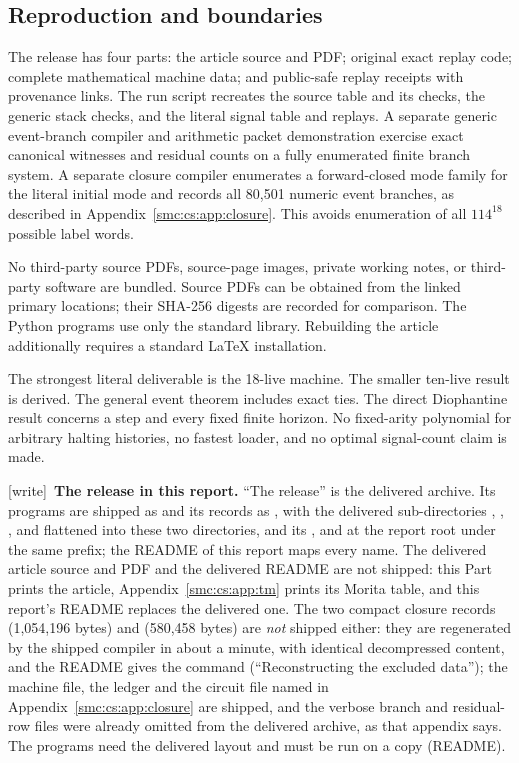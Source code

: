 \documentclass[11pt,letterpaper]{article}
\numberwithin{equation}{section}
\theoremstyle{definition}
\theoremstyle{remark}
\newcommand{\wtag}{\textup{[write]}}
\begin{document}
\subsection{Reproduction and boundaries}
The release has four parts: the article source and PDF; original exact replay code; complete mathematical machine data; and public-safe replay receipts with provenance links. The run script recreates the source table and its checks, the generic stack checks, and the literal signal table and replays. A separate generic event-branch compiler and arithmetic packet demonstration exercise exact canonical witnesses and residual counts on a fully enumerated finite branch system. A separate closure compiler enumerates a forward-closed mode family for the literal initial mode and records all 80,501 numeric event branches, as described in Appendix~\ref{smc:cs:app:closure}. This avoids enumeration of all $114^{18}$ possible label words.

No third-party source PDFs, source-page images, private working notes, or third-party software are bundled. Source PDFs can be obtained from the linked primary locations; their SHA-256 digests are recorded for comparison. The Python programs use only the standard library. Rebuilding the article additionally requires a standard LaTeX installation.

The strongest literal deliverable is the 18-live machine. The smaller ten-live result is derived. The general event theorem includes exact ties. The direct Diophantine result concerns a step and every fixed finite horizon. No fixed-arity polynomial for arbitrary halting histories, no fastest loader, and no optimal signal-count claim is made.

\wtag\ \textbf{The release in this report.} ``The release'' is the delivered archive. Its programs are shipped as  and its records as , with the delivered sub-directories , , ,  and  flattened into these two directories, and its ,  and  at the report root under the same prefix; the README of this report maps every name. The delivered article source and PDF and the delivered README are not shipped: this Part prints the article, Appendix~\ref{smc:cs:app:tm} prints its Morita table, and this report's README replaces the delivered one. The two compact closure records  (1,054,196 bytes) and  (580,458 bytes) are \emph{not} shipped either: they are regenerated by the shipped compiler in about a minute, with identical decompressed content, and the README gives the command (``Reconstructing the excluded data''); the machine file, the ledger and the circuit file named in Appendix~\ref{smc:cs:app:closure} are shipped, and the verbose branch and residual-row files were already omitted from the delivered archive, as that appendix says. The programs need the delivered layout and must be run on a copy (README).
\end{document}
